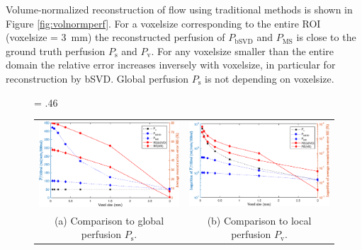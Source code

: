 \documentclass[final,5p,times,twocolumn]{elsarticle}
\begin{document}
Volume-normalized reconstruction of flow using traditional methods is shown in Figure \ref{fig:volnormperf}. For a voxelsize corresponding to the entire ROI (voxelsize = \SI{3}{\milli\meter}) the reconstructed perfusion of $P_{\mathrm{bSVD}}$ and $P_{\mathrm{MS}}$ is close to the ground truth perfusion $P_{\mathrm{s}}$ and $P_{\mathrm{v}}$. For any voxelsize smaller than the entire domain the relative error increases inversely with voxelsize, in particular for reconstruction by bSVD. Global perfusion $P_{\mathrm{s}}$ is not depending on voxelsize.
    \begin{figure}[]
    	\centering
    	\fwd = .46\textwidth
    	\begin{tabular}{c c}
    		\includegraphics[width=\fwd]{figs/E110_CBFOnDifferentResolutions_plot-Ps-scaleto-none.eps} & \includegraphics[width=\fwd]{figs/E110_CBFOnDifferentResolutions_plot-Pv-scaleto-none.eps}\\	
    		(a) Comparison to global perfusion $P_{\mathrm{s}}$. & (b) Comparison to local perfusion $P_{\mathrm{v}}$. \\

\end{tabular}
\end{figure}
\end{document}
